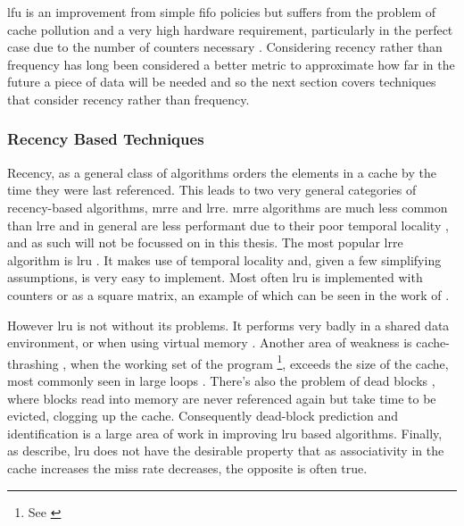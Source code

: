 \gls{lfu} is an improvement from simple \gls{fifo} policies but suffers from the problem of cache pollution and a very high hardware requirement, particularly in the perfect case due to the number of counters necessary \cite{podlipnigSurveyWebCache2003}. Considering recency rather than frequency has long been considered a better metric to approximate how far in the future a piece of data will be needed and so the next section covers techniques that consider recency rather than frequency. 

\subsubsection{Recency Based Techniques}
\label{sec:recency}

Recency, as a general class of algorithms orders the elements in a cache by the time they were last referenced. This leads to two very general categories of recency-based algorithms, \gls{mrre} and \gls{lrre}. \gls{mrre} algorithms are much less common than \gls{lrre} and in general are less performant due to their poor temporal locality \cite{pandaSurveyReplacementStrategies2016}, and as such will not be focussed on in this thesis. The most popular \gls{lrre} algorithm is \gls{lru} \cite{pitkowSimpleRobustCaching1994, karedlaCachingStrategiesImprove1994, smithCacheMemories1982}. It makes use of temporal locality and, given a few simplifying assumptions, is very easy to implement. Most often \gls{lru} is implemented with counters or as a square matrix, an example of which can be seen in the work of \citet{acklandSinglechip6billion16b2000}. 

However \gls{lru} is not without its problems. It performs very badly in a shared data environment, or when using virtual memory \cite{bansalCARClockAdaptive2004}. Another area of weakness is cache-thrashing \cite{denningThrashingItsCauses1968}, when the working set of the program \footnote{See \cite{denningWorkingSetModel1968}}, exceeds the size of the cache, most commonly seen in large loops \cite{linPredictingLastTouchReferences2002}. There's also the problem of dead blocks \cite{liuCacheBurstsNew2008a}, where blocks read into memory are never referenced again but take time to be evicted, clogging up the cache. Consequently dead-block prediction and identification is a large area of work in improving \gls{lru} based algorithms. Finally, as \citet{linPredictingLastTouchReferences2002} describe, \gls{lru} does not have the desirable property that as associativity in the cache increases the miss rate decreases, the opposite is often true.

